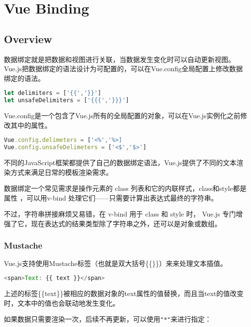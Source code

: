 \part{Vue Binding}


\chapter{Overview}

数据绑定就是把数据和视图进行关联，当数据发生变化时可以自动更新视图。Vue.js把数据绑定的语法设计为可配置的，可以在Vue.config全局配置上修改数据绑定的语法。



\begin{lstlisting}[language=JavaScript]
let delimiters = ['{{','}}']
let unsafeDelimiters = ['{{{','}}}']
\end{lstlisting}

Vue.config是一个包含了Vue.js所有的全局配置的对象，可以在Vue.js实例化之前修改其中的属性。



\begin{lstlisting}[language=JavaScript]
Vue.config.delimeters = ['<%','%>]
Vue.config.unsafeDelimeters = ['<$','$>']
\end{lstlisting}

不同的JavaScript框架都提供了自己的数据绑定语法，Vue.js提供了不同的文本渲染方式来满足日常的模板渲染需求。




数据绑定一个常见需求是操作元素的 class 列表和它的内联样式，class和style都是属性 ，可以用v-bind 处理它们——只需要计算出表达式最终的字符串。

不过，字符串拼接麻烦又易错，在 v-bind 用于 class 和 style 时， Vue.js 专门增强了它，现在表达式的结果类型除了字符串之外，还可以是对象或数组。

\section{Mustache}

Vue.js支持使用Mustache标签（也就是双大括号\{\{\}\}）来来处理文本插值。


\begin{lstlisting}[language=JavaScript]
<span>Text: {{ text }}</span>
\end{lstlisting}

上述的标签\{\{text\}\}被相应的数据对象的text属性的值替换，而且当text的值改变时，文本中的值也会联动地发生变化。

如果数据只需要渲染一次，后续不再更新，可以使用\texttt{"*"}来进行指定：

